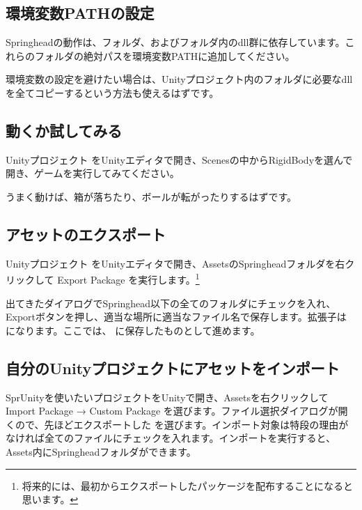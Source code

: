 \subsection{\KLUDGE 環境変数PATH\KLUDGE の設定}

Springhead\KLUDGE の動作は、\KLUDGE フォルダ、および\KLUDGE フォルダ内のdll\KLUDGE 群に依存しています。これらのフォルダの絶対パスを環境変数PATH\KLUDGE に追加してください。

\KLUDGE 環境変数の設定を避けたい場合は、Unity\KLUDGE プロジェクト内のフォルダ\KLUDGE に必要なdll\KLUDGE を全てコピーするという方法も使えるはずです。


\subsection{\KLUDGE 動くか試してみる}

Unity\KLUDGE プロジェクト  \KLUDGE をUnity\KLUDGE エディタで開き、Scenes\KLUDGE の中からRigidBody\KLUDGE を選んで開き、ゲームを実行してみてください。

\KLUDGE うまく動けば、箱が落ちたり、ボールが転がったりするはずです。


\subsection{\KLUDGE アセットのエクスポート}

Unity\KLUDGE プロジェクト  \KLUDGE をUnity\KLUDGE エディタで開き、Assets\KLUDGE のSpringhead\KLUDGE フォルダを右クリックして Export Package \KLUDGE を実行します。\footnote{\KLUDGE 将来的には、最初からエクスポートしたパッケージを配布することになると思います。}

\KLUDGE 出てきたダイアログでSpringhead\KLUDGE 以下の全てのフォルダにチェックを入れ、Export\KLUDGE ボタンを押し、適当な場所に適当なファイル名で保存します。拡張子は  \KLUDGE になります。ここでは、 \KLUDGE に保存したものとして進めます。

\subsection{\KLUDGE 自分のUnity\KLUDGE プロジェクトにアセットをインポート} \label{sec:importasset}

SprUnity\KLUDGE を使いたいプロジェクトをUnity\KLUDGE で開き、Assets\KLUDGE を右クリックして Import Package \KLUDGE → Custom Package \KLUDGE を選びます。ファイル選択ダイアログが開くので、先ほどエクスポートした  \KLUDGE を選びます。インポート対象は特段の理由がなければ全てのファイルにチェックを入れます。インポートを実行すると、Assets\KLUDGE 内にSpringhead\KLUDGE フォルダができます。


